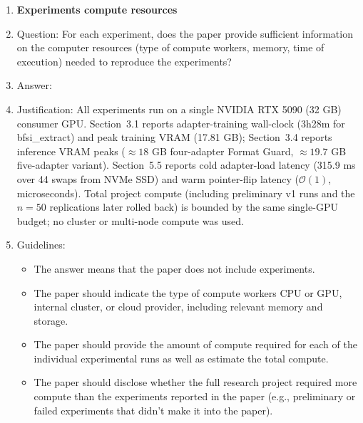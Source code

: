 \begin{enumerate}
\item {\bf Experiments compute resources}
    \item[] Question: For each experiment, does the paper provide sufficient information on the computer resources (type of compute workers, memory, time of execution) needed to reproduce the experiments?
    \item[] Answer: \answerYes{}
    \item[] Justification: All experiments run on a single NVIDIA RTX 5090 (32 GB) consumer GPU. Section~3.1 reports adapter-training wall-clock (3h28m for bfsi\_extract) and peak training VRAM (17.81 GB); Section~3.4 reports inference VRAM peaks ($\approx 18$ GB four-adapter Format Guard, $\approx 19.7$ GB five-adapter variant). Section~5.5 reports cold adapter-load latency (315.9 ms over 44 swaps from NVMe SSD) and warm pointer-flip latency ($\mathcal{O}(1)$, microseconds). Total project compute (including preliminary v1 runs and the $n{=}50$ replications later rolled back) is bounded by the same single-GPU budget; no cluster or multi-node compute was used.
    \item[] Guidelines:
    \begin{itemize}
        \item The answer \answerNA{} means that the paper does not include experiments.
        \item The paper should indicate the type of compute workers CPU or GPU, internal cluster, or cloud provider, including relevant memory and storage.
        \item The paper should provide the amount of compute required for each of the individual experimental runs as well as estimate the total compute. 
        \item The paper should disclose whether the full research project required more compute than the experiments reported in the paper (e.g., preliminary or failed experiments that didn't make it into the paper). 
    \end{itemize}
    

\end{enumerate}
